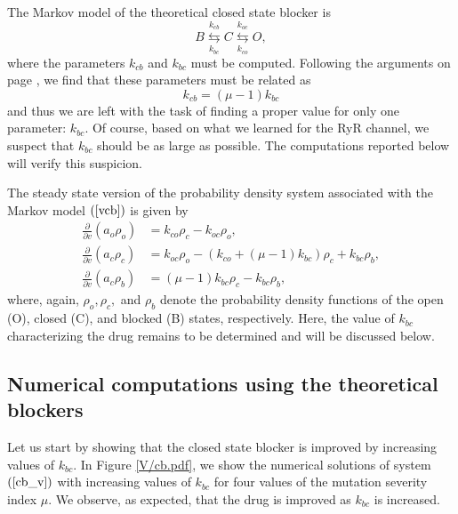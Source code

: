 \bigskip The Markov model of the theoretical closed state blocker is%
\begin{equation}
B\underset{k_{bc}}{\overset{k_{cb}}{\leftrightarrows}}C\underset{k_{co}%
}{\overset{k_{oc}}{\leftrightarrows}}O, \label{vcb}%
\end{equation}
where the parameters $k_{cb}$ and $k_{bc}$ must be computed. Following the
arguments on page \pageref{sec:eq-closed}, we find that these parameters must be
related as%
\begin{equation}
k_{cb}=\left(  \mu-1\right)  k_{bc} \label{kcbv}%
\end{equation}
and thus we are left with the task of finding a proper value for only one
parameter: $k_{bc}.$ Of course, based on what we learned for the RyR channel,
we suspect that $k_{bc}$ should be as large as possible. The computations 
reported below will verify this suspicion.

\bigskip The steady state version of the probability density system associated
with the Markov model $\left(  \ref{vcb}\right)  $ is given by%
\begin{align}
\frac{\partial}{\partial v}\left(  a_{o}\rho_{o}\right)   &  =k_{co}\rho
_{c}-k_{oc}\rho_{o},\nonumber\\
\frac{\partial}{\partial v}\left(  a_{c}\rho_{c}\right)   &  =k_{oc}\rho
_{o}-\left(  k_{co}+\left(  \mu-1\right)  k_{bc}\right)  \rho_{c}+k_{bc}%
\rho_{b},\label{cb_v}\\
\frac{\partial}{\partial v}\left(  a_{c}\rho_{b}\right)   &  =\left(
\mu-1\right)  k_{bc}\rho_{c}-k_{bc}\rho_{b},\nonumber
\end{align}
where, again, $\rho_{o},\rho_{c},$ and $\rho_{b}$ denote the probability density
functions of the open (O), closed (C), and blocked (B) states, respectively.
Here, the value of $k_{bc}$ characterizing the drug remains to be determined and
will be discussed below.

\bigskip

\subsection{Numerical computations using the theoretical blockers}

Let us start by showing that the closed state blocker is improved by
increasing values of $k_{bc}.$ In Figure \ref{V/cb.pdf}, we show the numerical solutions of system $\left(  \ref{cb_v}\right)  $ with
increasing values of $k_{bc}$ for four values of the mutation severity index
$\mu.$ We observe, as expected, that the drug is improved as $k_{bc}$ is increased.

